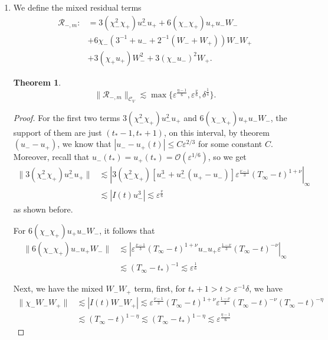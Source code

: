 \documentclass[letterpaper,11pt]{article}
\newcommand{\rmO}{\mathcal{O}}
\newcommand{\eps}{\varepsilon}
\newcommand{\lar}{ \lesssim }
\numberwithin{equation}{section}
\theoremstyle{plain}
\newtheorem{theorem}{Theorem}[section]
\begin{document}
\begin{enumerate}
\begin{itemize}
\begin{enumerate}
\item We define the mixed residual terms
\begin{align*}
\mathcal{R}_{-,m} :&= 3(\chi_-^2\chi_+) u_-^2 u_+  + 6(\chi_-\chi_+) u_+ u_-W_- \\ 
&+ 6\chi_-(3^{-1}+u_- +2^{-1}(W_-+W_+))W_-W_+
\\ 
&+3(\chi_+u_+)W_-^2 + 3(\chi_-u_-)^2W_+ .
\end{align*}

\begin{theorem}
\[
\|\mathcal{R}_{-,m} \|_{\mathcal{C}_V} \lar \max\{\eps^{\frac{\eta-1}{6}}, \eps^{\frac{\nu}{6}}, \delta^{\frac{1}{4}} \}.
\]
\end{theorem}
\begin{proof}
For the first two terms $3(\chi_-^2\chi_+)u_-^2u_+$ and $6(\chi_-\chi_+)u_+u_-W_-$, the support of them are just $(t_*-1,t_*+1)$, on this interval, by theorem $(u_--u_+)$, we know that $|u_- - u_+(t)| \le C\eps^{2/3}$ for some constant $C$. Moreover, recall that $u_-(t_*) = u_+(t_*) = \rmO(\eps^{1/6})$, so we get
\begin{align*}
\|3(\chi_-^2\chi_+)u_-^2u_+ \| &\lar | 3(\chi_-^2\chi_+)[u_-^3+u_-^2(u_+ -u_-)]  \eps^{\frac{\nu-1}{3}}(T_\infty -t)^{1+\nu} |_{\infty} \\
& \lar |I(t)u_-^3| \lar \eps^{\frac{\nu}{6}}
\end{align*}
as shown before.

For $6(\chi_-\chi_+)u_+u_-W_-$, it follows that
\begin{align*}
\|6(\chi_-\chi_+)u_-u_+W_- \| &\lar |\eps^{\frac{\nu-1}{3}} (T_\infty-t)^{1+\nu}u_-u_+ \eps^{\frac{1-\nu}{3}}(T_\infty-t)^{-\nu} |_{\infty} \\
& \lar (T_\infty-t_*)^{-1} \lar \eps^{\frac{1}{6}}
\end{align*}

Next, we have the mixed $W_-W_+$ term, first, 
for $t_*+1> t >\eps^{-1}\delta$, we have
\begin{align*}
\|\chi_-W_- W_+ \| &\lar |I(t)W_-W_+| \lar \eps^{\frac{\nu-1}{3}} (T_\infty-t)^{1+\nu} \eps^{\frac{1-\nu}{3}} (T_\infty-t)^{-\nu} (T_\infty-t)^{-\eta} \\
& \lar (T_\infty-t)^{1-\eta} \lar (T_\infty-t_*)^{1-\eta} \lar \eps^{\frac{\eta-1}{6}}
\end{align*}


\end{proof}
\end{enumerate}
\end{itemize}
\end{enumerate}
\end{document}
